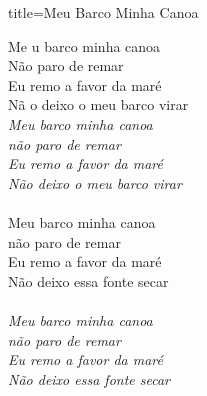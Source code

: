 \documentclass[fontsize=14pt, twoside]{scrreprt}
\begin{document}
\begin{multicols*}{2}
\columnbreak
\begin{song}{title={Meu Barco Minha Canoa}}
        \begin{verse*}
            Me u barco minha canoa\\
            Não paro de remar\\
            Eu remo a favor da maré\\
            Nã o deixo o meu barco virar\\

            \textit{Meu barco minha canoa }\\
            \textit{não paro de remar}\\
            \textit{Eu remo a favor da maré}\\
            \textit{Não deixo o meu barco virar}\\
            \\
            Meu barco minha canoa\\
            não paro de remar\\
            Eu remo a favor da maré\\
            Não deixo essa fonte secar\\
            \\
            \textit{Meu barco minha canoa }\\
            \textit{não paro de remar}\\
            \textit{Eu remo a favor da maré}\\
            \textit{Não deixo essa fonte secar}\\


\end{verse*}
\end{song}
\end{multicols*}
\end{document}
